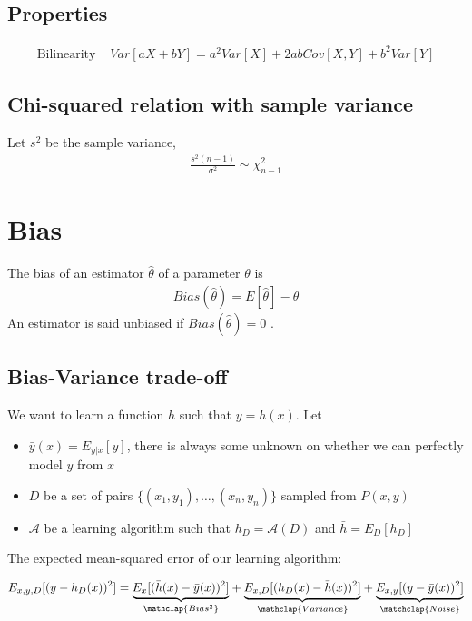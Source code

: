 \documentclass[../main.tex]{subfiles}
\begin{document}
\subsection{Properties}
\begin{align*}
    \text{Bilinearity }&Var[aX + bY] = a^2Var[X] + 2abCov[X, Y] + b^2 Var[Y]
\end{align*}

\subsection{Chi-squared relation with sample variance}
Let $s^2$ be the sample variance,
\begin{align*}
    \frac{s^2(n-1)}{\sigma^2} \sim \chi_{n-1}^2
\end{align*}

\section{Bias}
The bias of an estimator $\hat{\theta}$ of a parameter $\theta$ is
\begin{align*}
    Bias(\hat{\theta}) = E[\hat{\theta}] - \theta
\end{align*}
An estimator is said unbiased if $Bias(\hat{\theta}) = 0$ .

\subsection{Bias-Variance trade-off}
We want to learn a function $h$ such that $y = h(x)$.
Let \\
\begin{itemize}
    \item $\bar{y}(x) = E_{y|x}[y]$, there is always some unknown on whether we can perfectly model $y$ from $x$
    \item $D$ be a set of pairs $\{(x_1,y_1),\dots,(x_n,y_n)\}$ sampled from $P(x, y)$
\item $\mathcal{A}$ be a learning algorithm such that $h_D = \mathcal{A}(D)$ and $\bar{h} = E_D[h_D]$
\end{itemize}
The expected mean-squared error of our learning algorithm:

\begin{align*}
    E_{x,y,D}[(y - h_D(x))^2] =
        {\underbrace{E_{x}[(\bar{h}(x) - \bar{y}(x))^2]}_{\mathclap {Bias^2}}} +
        {\underbrace{E_{x,D}[(h_D(x) - \bar{h}(x))^2]}_{\mathclap {Variance}}} +
        {\underbrace{E_{x,y}[(y - \bar{y}(x))^2]}_{\matchclap {Noise}}}
\end{align*}
\end{document}
